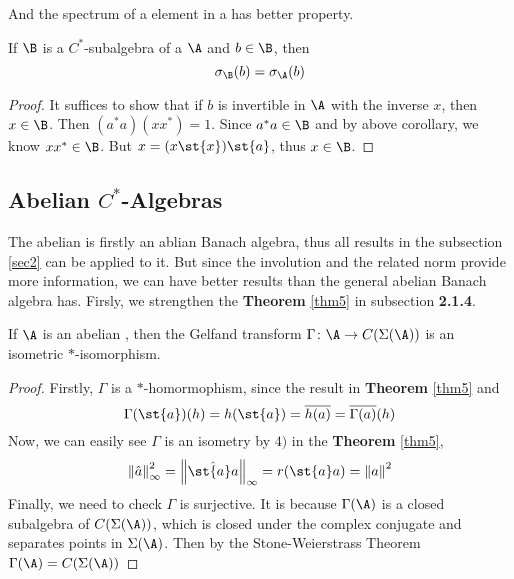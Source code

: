 And the spectrum of a element in a \Cs has better property.

\begin{thm}
	If $\B$ is a $C^{*}$-subalgebra of a \Cs $\A$ and $b \in \B$, then
	\begin{equation*}
		\sigma_{\B}(b) = \sigma_{\A}(b)
	\end{equation*}
\end{thm} 
\begin{proof}
	It suffices to show that if $b$ is invertible in $\A$ with the inverse $x$, then $x \in \B$. Then $(a^{*}a)(xx^{*})=1$. Since $a^{*}a \in \B$ and by above corollary, we know $xx^{*} \in \B$. But $x = (x\st{x})\st{a}$, thus $x \in \B$.
\end{proof}

\subsection{Abelian \texorpdfstring{$C^{*}$-Algebras}{C*-Algebras}}

The abelian \Cs is firstly an ablian Banach algebra, thus all results in the subsection \ref{sec2} can be applied to it. But since the involution and the related norm provide more information, we can have better results than the general abelian Banach algebra has. Firsly, we strengthen the \textbf{Theorem} \ref{thm5} in subsection \textbf{2.1.4}.

\begin{thm}
	If $\A$ is an abelian \Cs, then the Gelfand transform $\Gamma \colon \A \sto C(\Sigma(\A))$ is an isometric $*$-isomorphism.
\end{thm}
\begin{proof}
	Firstly, $\Gamma$ is a $*$-homormophism, since the result in \textbf{Theorem} \ref{thm5} and
	\begin{equation*}
		\Gamma(\st{a})(h) = h(\st{a}) = \clo{h(a)} = \clo{\Gamma(a)}(h)
	\end{equation*}
	Now, we can easily see $\Gamma$ is an isometry by $4)$ in the \textbf{Theorem} \ref{thm5},
	\begin{equation*}
		\norm{\hat{a}}_{\infty}^{2} = \norm{\hat{\st{a}a}}_{\infty} = r(\st{a}a) = \norm{a}^2
	\end{equation*}
	Finally, we need to check $\Gamma$ is surjective. It is because $\Gamma(\A)$ is a closed subalgebra of $C(\Sigma(\A))$, which is closed under the complex conjugate and separates points in $\Sigma(\A)$. Then by the Stone-Weierstrass Theorem $\Gamma(\A)=C(\Sigma(\A))$
\end{proof}

